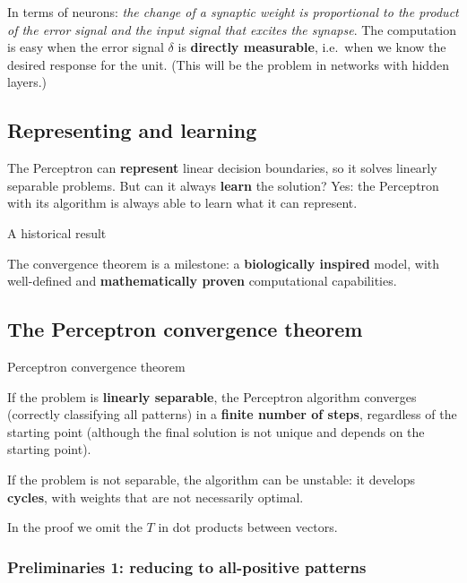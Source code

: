 In terms of neurons: \emph{the change of a synaptic weight is
proportional to the product of the error signal and the input signal
that excites the synapse}. The computation is easy when the error
signal \(\delta\) is \textbf{directly measurable}, i.e.\ when we know
the desired response for the unit. (This will be the problem in
networks with hidden layers.)

\subsection{Representing and
learning}\label{rappresentare-e-apprendere}

The Perceptron can \textbf{represent} linear decision boundaries, so it
solves linearly separable problems. But can it always \textbf{learn}
the solution? Yes: the Perceptron with its algorithm is always able to
learn what it can represent.

\begin{boxnote}{A historical result}

The convergence theorem is a milestone: a \textbf{biologically
inspired} model, with well-defined and \textbf{mathematically proven}
computational capabilities.

\end{boxnote}

\subsection{The Perceptron convergence
theorem}\label{il-teorema-di-convergenza-del-perceptron}

\begin{boxtheorem}{Perceptron convergence theorem}

If the problem is \textbf{linearly separable}, the Perceptron algorithm
converges (correctly classifying all patterns) in a \textbf{finite
number of steps}, regardless of the starting point (although the final
solution is not unique and depends on the starting point).

If the problem is not separable, the algorithm can be unstable: it
develops \textbf{cycles}, with weights that are not necessarily
optimal.

\end{boxtheorem}

In the proof we omit the \(T\) in dot products between vectors.

\subsubsection{Preliminaries 1: reducing to all-positive
patterns}\label{preliminari-1-ridursi-a-pattern-tutti-positivi}

